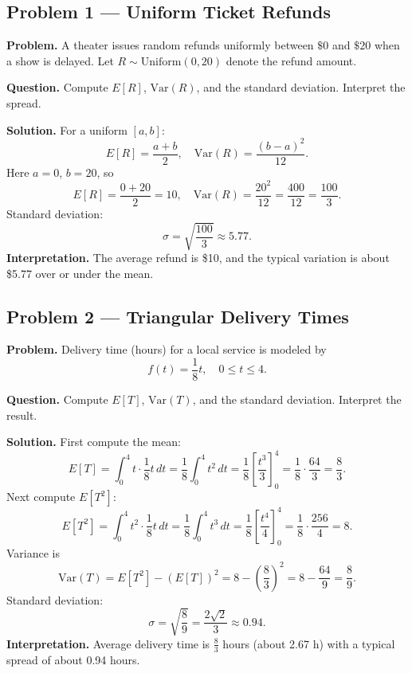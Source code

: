 	
	\begin{ExamProblems}
		
		\hypertarget{c4-ex1}{}
		\item
		\subsection*{Problem 1 — Uniform Ticket Refunds}
		
		\textbf{Problem.}
		A theater issues random refunds uniformly between \(\$0\) and \(\$20\) when a show is delayed.
		Let \(R\sim\text{Uniform}(0,20)\) denote the refund amount.
		
		\textbf{Question.} Compute \(E[R]\), \(\mathrm{Var}(R)\), and the standard deviation. Interpret the spread.
		
		\textbf{Solution.}
		For a uniform \([a,b]\):
		\[
		E[R]=\frac{a+b}{2},\quad \mathrm{Var}(R)=\frac{(b-a)^2}{12}.
		\]
		Here \(a=0\), \(b=20\), so
		\[
		E[R]=\frac{0+20}{2}=10,\quad \mathrm{Var}(R)=\frac{20^2}{12}=\frac{400}{12}=\frac{100}{3}.
		\]
		Standard deviation:
		\[
		\sigma=\sqrt{\frac{100}{3}}\approx 5.77.
		\]
		\textbf{Interpretation.} The average refund is \$10, and the typical variation is about \$5.77
		over or under the mean.
		
		
		\hypertarget{c4-ex2}{}
		\item
		\subsection*{Problem 2 — Triangular Delivery Times}
		
		\textbf{Problem.}
		Delivery time (hours) for a local service is modeled by
		\[
		f(t)=\frac{1}{8}t,\quad 0\le t\le 4.
		\]
		
		\textbf{Question.} Compute \(E[T]\), \(\mathrm{Var}(T)\), and the standard deviation. Interpret the result.
		
		\textbf{Solution.}
		First compute the mean:
		\[
		E[T]=\int_0^4 t\cdot \frac{1}{8}t\,dt=\frac{1}{8}\int_0^4 t^2\,dt
		=\frac{1}{8}\left[\frac{t^3}{3}\right]_0^4=\frac{1}{8}\cdot\frac{64}{3}=\frac{8}{3}.
		\]
		Next compute \(E[T^2]\):
		\[
		E[T^2]=\int_0^4 t^2\cdot \frac{1}{8}t\,dt=\frac{1}{8}\int_0^4 t^3\,dt
		=\frac{1}{8}\left[\frac{t^4}{4}\right]_0^4=\frac{1}{8}\cdot\frac{256}{4}=8.
		\]
		Variance is
		\[
		\mathrm{Var}(T)=E[T^2]-(E[T])^2=8-\left(\frac{8}{3}\right)^2
		=8-\frac{64}{9}=\frac{8}{9}.
		\]
		Standard deviation:
		\[
		\sigma=\sqrt{\frac{8}{9}}=\frac{2\sqrt{2}}{3}\approx 0.94.
		\]
		\textbf{Interpretation.} Average delivery time is \(\frac{8}{3}\) hours (about 2.67 h) with
		a typical spread of about 0.94 hours.
		
	\end{ExamProblems}
	
